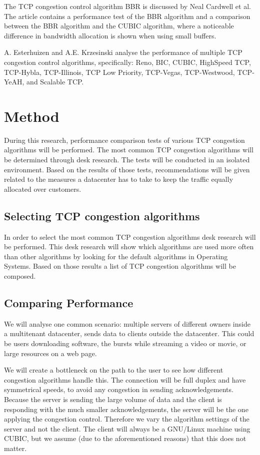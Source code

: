 \documentclass{article}
\begin{document}
The TCP congestion control algorithm BBR is discussed by Neal Cardwell et
al.\cite{bbr-congestion} The article contains a performance test of the BBR
algorithm and a comparison between the BBR algorithm and the CUBIC algorithm,
where a noticeable difference in bandwidth allocation is shown when using small
buffers.

A. Esterhuizen and A.E. Krzesinski\cite{multiple-congestion} analyse the
performance of multiple TCP congestion control algorithms, specifically: Reno,
BIC, CUBIC, HighSpeed TCP, TCP-Hybla, TCP-Illinois, TCP Low Priority,
TCP-Vegas, TCP-Westwood, TCP-YeAH, and Scalable TCP.


\section{Method}\label{sec:method}

During this research, performance comparison tests of various TCP congestion algorithms will be performed. The most common TCP congestion algorithms will be determined through desk research. The tests will be conducted in an isolated environment. Based on the results of those tests, recommendations will be given related to the measures a datacenter has to take to keep the traffic equally allocated over customers.


\subsection{Selecting TCP congestion algorithms}

In order to select the most common TCP congestion algorithms desk research will be performed. This desk research will show which algorithms are used more often than other algorithms by looking for the default algorithms in Operating Systems. Based on those results a list of TCP congestion algorithms will be composed.


\subsection{Comparing Performance}

We will analyse one common scenario: multiple servers of different owners
inside a multitenant datacenter, sends data to clients outside the datacenter.
This could be users downloading software, the bursts while streaming a video
or movie, or large resources on a web page.

We will create a bottleneck on the path to the user to see how different
congestion algorithms handle this. The connection will be full duplex and have
symmetrical speeds, to avoid any congestion in sending acknowledgements.
Because the server is sending the large volume of data and the client is
responding with the much smaller acknowledgements, the server will be the one
applying the congestion control. Therefore we vary the algorithm settings of
the server and not the client. The client will always be a GNU/Linux machine
using CUBIC, but we assume (due to the aforementioned reasons) that this does
not matter.
\end{document}
